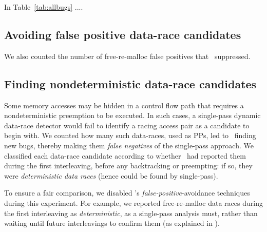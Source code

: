 In Table~\ref{tab:allbugs} .... %


\subsection{Avoiding false positive data-race candidates}
\label{sec:eval-falsepos}

We also counted the number of free-re-malloc false positives that \landslide~suppressed.


\subsection{Finding nondeterministic data-race candidates}
\label{sec:eval-falseneg}
Some memory accesses may be hidden in a control flow path that requires a nondeterministic preemption to be executed.
In such cases, a single-pass dynamic data-race detector
would fail
to identify a racing access pair as a candidate to begin with.
%
We counted how many such data-races, used as PPs, led to \quicksand~finding new bugs,
thereby making them {\em false negatives} of the single-pass approach.
We classified each data-race candidate according to whether \landslide~had reported them during the first interleaving, before any backtracking or preempting: if so, they were {\em deterministic data races} (hence could be found by single-pass).

To ensure a fair comparison, we disabled \landslide's {\em false-positive}-avoidance techniques during this experiment.
For example, we reported free-re-malloc data races during the first interleaving as {\em deterministic}, as a single-pass analysis must,
rather than waiting until future interleavings to confirm them (as explained in \sect{\ref{sec:free-re-malloc}}).


